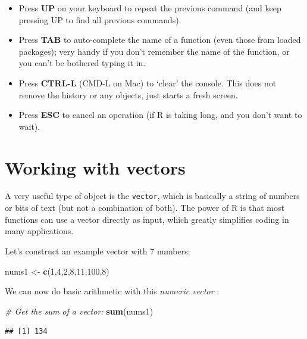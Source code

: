 \documentclass[]{book}
\newenvironment{Shaded}{\begin{snugshade}}{\end{snugshade}}
\newcommand{\CommentTok}[1]{\textcolor[rgb]{0.56,0.35,0.01}{\textit{#1}}}
\newcommand{\DecValTok}[1]{\textcolor[rgb]{0.00,0.00,0.81}{#1}}
\newcommand{\KeywordTok}[1]{\textcolor[rgb]{0.13,0.29,0.53}{\textbf{#1}}}
\newcommand{\NormalTok}[1]{#1}
\newcommand{\StringTok}[1]{\textcolor[rgb]{0.31,0.60,0.02}{#1}}
\providecommand{\tightlist}{%
  \setlength{\itemsep}{0pt}\setlength{\parskip}{0pt}}
\begin{document}
\begin{itemize}
\tightlist
\item
  Press \textbf{UP} on your keyboard to repeat the previous command (and keep pressing UP to find all previous commands).
\item
  Press \textbf{TAB} to auto-complete the name of a function (even those from loaded packages); very handy if you don't remember the name of the function, or you can't be bothered typing it in.
\item
  Press \textbf{CTRL-L} (CMD-L on Mac) to `clear' the console. This does not remove the history or any objects, just starts a fresh screen.
\item
  Press \textbf{ESC} to cancel an operation (if R is taking long, and you don't want to wait).
\end{itemize}

\hypertarget{vectorintro}{%
\section{Working with vectors}\label{vectorintro}}

A very useful type of object is the \texttt{vector}, which is basically a string of numbers or bits of text (but not a combination of both). The power of R is that most functions can use a vector directly as input, which greatly simplifies coding in many applications.

Let's construct an example vector with 7 numbers:

\begin{Shaded}
\begin{Highlighting}[]
\NormalTok{nums1 <-}\StringTok{ }\KeywordTok{c}\NormalTok{(}\DecValTok{1}\NormalTok{,}\DecValTok{4}\NormalTok{,}\DecValTok{2}\NormalTok{,}\DecValTok{8}\NormalTok{,}\DecValTok{11}\NormalTok{,}\DecValTok{100}\NormalTok{,}\DecValTok{8}\NormalTok{)}
\end{Highlighting}
\end{Shaded}

We can now do basic arithmetic with this \emph{numeric vector} :

\begin{Shaded}
\begin{Highlighting}[]
\CommentTok{# Get the sum of a vector:}
\KeywordTok{sum}\NormalTok{(nums1)}
\end{Highlighting}
\end{Shaded}

\begin{verbatim}
## [1] 134
\end{verbatim}
\end{document}
